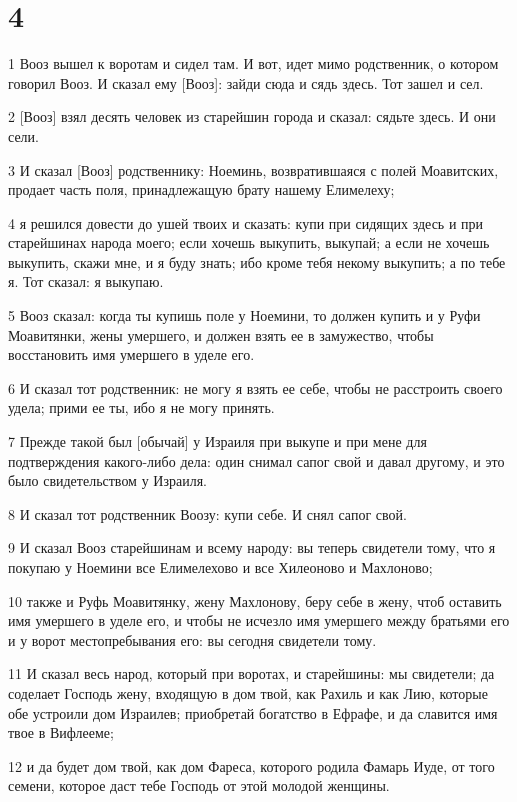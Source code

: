 \chapter{4}

\par 1 Вооз вышел к воротам и сидел там. И вот, идет мимо родственник, о котором говорил Вооз. И сказал ему [Вооз]: зайди сюда и сядь здесь. Тот зашел и сел.
\par 2 [Вооз] взял десять человек из старейшин города и сказал: сядьте здесь. И они сели.
\par 3 И сказал [Вооз] родственнику: Ноеминь, возвратившаяся с полей Моавитских, продает часть поля, принадлежащую брату нашему Елимелеху;
\par 4 я решился довести до ушей твоих и сказать: купи при сидящих здесь и при старейшинах народа моего; если хочешь выкупить, выкупай; а если не хочешь выкупить, скажи мне, и я буду знать; ибо кроме тебя некому выкупить; а по тебе я. Тот сказал: я выкупаю.
\par 5 Вооз сказал: когда ты купишь поле у Ноемини, то должен купить и у Руфи Моавитянки, жены умершего, и должен взять ее в замужество, чтобы восстановить имя умершего в уделе его.
\par 6 И сказал тот родственник: не могу я взять ее себе, чтобы не расстроить своего удела; прими ее ты, ибо я не могу принять.
\par 7 Прежде такой был [обычай] у Израиля при выкупе и при мене для подтверждения какого-либо дела: один снимал сапог свой и давал другому, и это было свидетельством у Израиля.
\par 8 И сказал тот родственник Воозу: купи себе. И снял сапог свой.
\par 9 И сказал Вооз старейшинам и всему народу: вы теперь свидетели тому, что я покупаю у Ноемини все Елимелехово и все Хилеоново и Махлоново;
\par 10 также и Руфь Моавитянку, жену Махлонову, беру себе в жену, чтоб оставить имя умершего в уделе его, и чтобы не исчезло имя умершего между братьями его и у ворот местопребывания его: вы сегодня свидетели тому.
\par 11 И сказал весь народ, который при воротах, и старейшины: мы свидетели; да соделает Господь жену, входящую в дом твой, как Рахиль и как Лию, которые обе устроили дом Израилев; приобретай богатство в Ефрафе, и да славится имя твое в Вифлееме;
\par 12 и да будет дом твой, как дом Фареса, которого родила Фамарь Иуде, от того семени, которое даст тебе Господь от этой молодой женщины.
